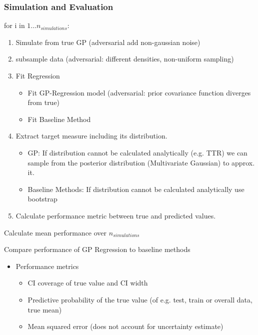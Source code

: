 \documentclass[
	8pt, %
]{beamer}
\begin{document}
\begin{frame}
	\frametitle{Simulation and Evaluation}
		for i in $1 \dots n_{simulations}$:
		\begin{enumerate}
			\item Simulate from true GP (adversarial add non-gaussian noise)
			\item subsample data (adversarial: different densities, non-uniform sampling)
			\item Fit Regression
			\begin{itemize}
				\item Fit GP-Regression model (adversarial: prior covariance function diverges from true)
				\item Fit Baseline Method
			\end{itemize}
			\item Extract target measure including its distribution.
				\begin{itemize}
					\item GP: If distribution cannot be calculated analytically (e.g. TTR) we can
					sample from the posterior distribution (Multivariate Gaussian) to approx. it.
					\item Baseline Methods: If distribution cannot be calculated analytically use bootstrap
				\end{itemize}
			\item Calculate performance metric between true and predicted values.
		\end{enumerate}
	\smallskip
	Calculate mean performance over $n_{simulations}$
	\smallskip

	Compare performance of GP Regression to baseline methods

	\bigskip %

	\begin{itemize}
		\item Performance metrics
		\begin{itemize}
			\item CI coverage of true value and CI width
			\item Predictive probability of the true value (of e.g. test, train or overall data, true mean)
			\item Mean squared error (does not account for uncertainty estimate)
		\end{itemize}
	\end{itemize}

\end{frame}
\end{document}
